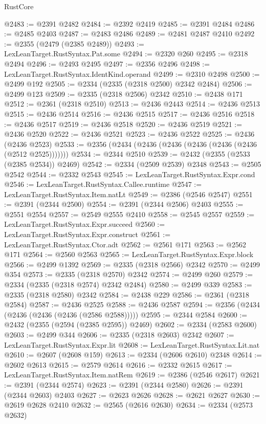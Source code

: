 \begin{lexlean}{RustCore}
\begin{coremodule}
@2483 := @2391 @2482
@2484 := @2392 @2419
@2485 := @2391 @2484
@2486 := @2485 @2403
@2487 := @2483 @2486
@2489 := @2481 @2487 @2410
@2492 := @2355 (@2479 (@2385 @2489))
@2493 := LexLeanTarget.RustSyntax.Pat.some
@2494 := @2320 @260
@2495 := @2318 @2494
@2496 := @2493 @2495
@2497 := @2356 @2496
@2498 := LexLeanTarget.RustSyntax.IdentKind.operand
@2499 := @2310 @2498
@2500 := @2499 @192
@2505 := @2334 (@2335 (@2318 @2500) @2342 @2484)
@2506 := @2499 @123
@2509 := @2335 (@2318 @2506) @2342
@2510 := @2438 @171
@2512 := @2361 (@2318 @2510)
@2513 := @2436 @2443
@2514 := @2436 @2513
@2515 := @2436 @2514
@2516 := @2436 @2515
@2517 := @2436 @2516
@2518 := @2436 @2517
@2519 := @2436 @2518
@2520 := @2436 @2519
@2521 := @2436 @2520
@2522 := @2436 @2521
@2523 := @2436 @2522
@2525 := @2436 (@2436 @2523)
@2533 := @2356 (@2434 (@2436 (@2436 (@2436 (@2436 (@2436 (@2512 @2525)))))))
@2534 := @2344 @2510
@2539 := @2432 (@2355 (@2533 (@2385 @2534)) @2469)
@2542 := @2334 (@2509 @2539) @2348
@2543 := @2505 @2542
@2544 := @2332 @2543
@2545 := LexLeanTarget.RustSyntax.Expr.cond
@2546 := LexLeanTarget.RustSyntax.Callee.runtime
@2547 := LexLeanTarget.RustSyntax.Item.natLt
@2549 := @2386 (@2546 @2547)
@2551 := @2391 (@2344 @2500)
@2554 := @2391 (@2344 @2506) @2403
@2555 := @2551 @2554
@2557 := @2549 @2555 @2410
@2558 := @2545 @2557
@2559 := LexLeanTarget.RustSyntax.Expr.succeed
@2560 := LexLeanTarget.RustSyntax.Expr.construct
@2561 := LexLeanTarget.RustSyntax.Ctor.adt
@2562 := @2561 @171
@2563 := @2562 @171
@2564 := @2560 @2563
@2565 := LexLeanTarget.RustSyntax.Expr.block
@2566 := @2499 @1392
@2569 := @2335 (@2318 @2566) @2342
@2570 := @2499 @354
@2573 := @2335 (@2318 @2570) @2342
@2574 := @2499 @260
@2579 := @2334 (@2335 (@2318 @2574) @2342 @2484)
@2580 := @2499 @339
@2583 := @2335 (@2318 @2580) @2342
@2584 := @2438 @229
@2586 := @2361 (@2318 @2584)
@2587 := @2436 @2525
@2588 := @2436 @2587
@2594 := @2356 (@2434 (@2436 (@2436 (@2436 (@2586 @2588)))))
@2595 := @2344 @2584
@2600 := @2432 (@2355 (@2594 (@2385 @2595)) @2469)
@2602 := @2334 (@2583 @2600)
@2603 := @2499 @344
@2606 := @2335 (@2318 @2603) @2342
@2607 := LexLeanTarget.RustSyntax.Expr.lit
@2608 := LexLeanTarget.RustSyntax.Lit.nat
@2610 := @2607 (@2608 @159)
@2613 := @2334 (@2606 @2610) @2348
@2614 := @2602 @2613
@2615 := @2579 @2614
@2616 := @2332 @2615
@2617 := LexLeanTarget.RustSyntax.Item.natRem
@2619 := @2386 (@2546 @2617)
@2621 := @2391 (@2344 @2574)
@2623 := @2391 (@2344 @2580)
@2626 := @2391 (@2344 @2603) @2403
@2627 := @2623 @2626
@2628 := @2621 @2627
@2630 := @2619 @2628 @2410
@2632 := @2565 (@2616 @2630)
@2634 := @2334 (@2573 @2632)

\end{coremodule}
\end{lexlean}
